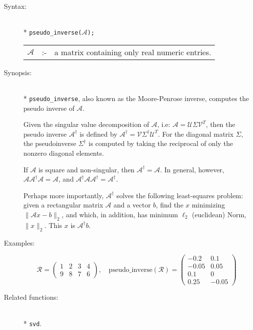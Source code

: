 \begin{description}
\item[Syntax:]\mbox{}\\*
\texttt{pseudo\_inverse($\mathcal{A}$);}\\[2mm]
\begin{tabular}{l l l}
$\mathcal{A}$ &:-& a matrix containing only real numeric entries.
\end{tabular}

\item[Synopsis:]\mbox{}\\*
\texttt{pseudo\_inverse}, also known as the Moore-Penrose inverse, computes
the pseudo inverse of $\mathcal{A}$.

Given the singular value decomposition of $\mathcal{A}$, i.e: $\mathcal{A} =
\mathcal{U}
\Sigma\mathcal{V}^T$, then the pseudo inverse $\mathcal{A}^{\dagger}$ is defined
by $\mathcal{A}^{\dagger} = \mathcal{V} \Sigma^{\dagger} \mathcal{U}^{T}$. For the
diagonal
matrix $\Sigma$, the pseudoinverse $\Sigma^{\dagger}$ is computed by taking the reciprocal
of only the nonzero diagonal elements.

If $\mathcal{A}$ is square and non-singular, then $\mathcal{A}^{\dagger} = \mathcal{A}$.
In general, however,
$\mathcal{A} \mathcal{A}^{\dagger} \mathcal{A} = \mathcal{A}$, and
$\mathcal{A}^{\dagger} \mathcal{A} \mathcal{A}^{\dagger} = \mathcal{A}^{\dagger}$.

Perhaps more importantly, $\mathcal{A}^{\dagger}$ solves the following least-squares
problem: given a rectangular matrix $\mathcal{A}$ and a vector $b$, find the
$x$ minimizing $\|\mathcal{A}x - b\|_2$,
and which, in addition, has minimum $\ell_{2}$ (euclidean) Norm, $\|x\|_2$.
This $x$ is $\mathcal{A}^{\dagger} b$.

\item[Examples:]
\begin{flushleft}
\[
\mathcal{R} = \begin{pmatrix} 1 & 2 & 3 & 4 \\ 9 & 8 & 7 & 6 \end{pmatrix},
\quad
\text{pseudo}\_\text{inverse}(\mathcal{R}) =
        \begin{pmatrix} -0.2 & 0.1 \\ -0.05 & 0.05 \\ 0.1 & 0 \\ 0.25 & -0.05 \end{pmatrix}
\]
\end{flushleft}

\item[Related functions:]\mbox{}\\*
\texttt{svd}.
\end{description}

